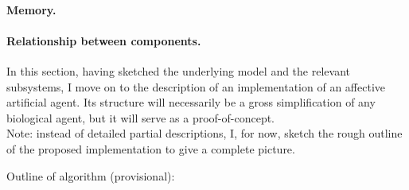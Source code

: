 \paragraph{Memory.}

\paragraph{Relationship between components.}

\newpage



In this section, having sketched the underlying model and the relevant subsystems, I move on to the description of an implementation of an affective artificial agent. Its structure will necessarily be a gross simplification of any biological agent, but it will serve as a proof-of-concept.\\

\noindent
Note: instead of detailed partial descriptions, I, for now, sketch the rough outline of the proposed implementation to give a complete picture.

Outline of algorithm (provisional):

